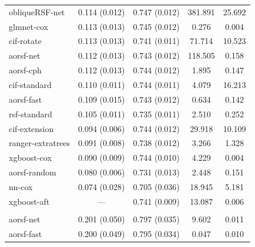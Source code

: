 \documentclass{article}\usepackage[]{graphicx}\usepackage[]{xcolor}
\newenvironment{knitrout}{}{} %
\begin{document}
\begin{knitrout}
\begin{longtable}[t]{lcccc}
\hline
\hspace{1em}obliqueRSF-net & 0.114 (0.012) & 0.747 (0.012) & 381.891 & 25.692\\
\hspace{1em}glmnet-cox & 0.113 (0.013) & 0.745 (0.012) & 0.276 & 0.004\\
\hspace{1em}cif-rotate & 0.113 (0.013) & 0.741 (0.011) & 71.714 & 10.523\\
\hspace{1em}aorsf-net & 0.112 (0.013) & 0.743 (0.012) & 118.505 & 0.158\\
\hspace{1em}aorsf-cph & 0.112 (0.013) & 0.744 (0.012) & 1.895 & 0.147\\
\hspace{1em}cif-standard & 0.110 (0.011) & 0.744 (0.011) & 4.079 & 16.213\\
\hspace{1em}aorsf-fast & 0.109 (0.015) & 0.743 (0.012) & 0.634 & 0.142\\
\hspace{1em}rsf-standard & 0.105 (0.011) & 0.735 (0.011) & 2.510 & 0.252\\
\hspace{1em}cif-extension & 0.094 (0.006) & 0.744 (0.012) & 29.918 & 10.109\\
\hspace{1em}ranger-extratrees & 0.091 (0.008) & 0.738 (0.012) & 3.266 & 1.328\\
\hspace{1em}xgboost-cox & 0.090 (0.009) & 0.744 (0.010) & 4.229 & 0.004\\
\hspace{1em}aorsf-random & 0.080 (0.006) & 0.731 (0.013) & 2.448 & 0.151\\
\hspace{1em}nn-cox & 0.074 (0.028) & 0.705 (0.036) & 18.945 & 5.181\\
\hspace{1em}xgboost-aft & --- & 0.741 (0.009) & 13.087 & 0.006\\
\addlinespace[0.3em]
\multicolumn{5}{l}{\textit{\textbf{VA lung cancer trial; death, n = 137, p = 8}}}\\
\hline
\hspace{1em}aorsf-net & 0.201 (0.050) & 0.797 (0.035) & 9.602 & 0.011\\
\hspace{1em}aorsf-fast & 0.200 (0.049) & 0.795 (0.034) & 0.047 & 0.010\\

\end{longtable}
\end{knitrout}
\end{document}
